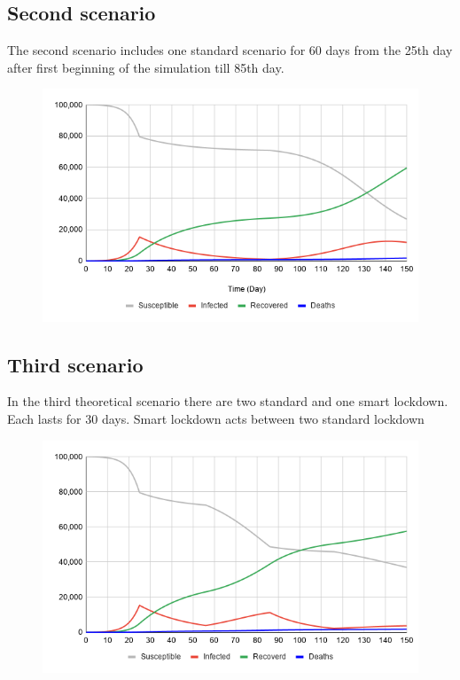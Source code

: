 \documentclass[12pt,a4paper,english]{article}
\begin{document}
    \subsection{Second scenario}
    The second scenario includes one standard scenario for 60 days from the 25th day after first beginning of the simulation till 85th day.
    \begin{figure}[h!]
        \centering
        \includegraphics[scale=0.55]{1large.png}
    \end{figure}

    \subsection{Third scenario}
    In the third theoretical scenario there are two standard and one smart lockdown.
    Each lasts for 30 days.
    Smart lockdown acts between two standard lockdown
    \begin{figure}[h!]
        \centering
        \includegraphics[scale=0.55]{2short+smart.png}
    \end{figure}
\end{document}
